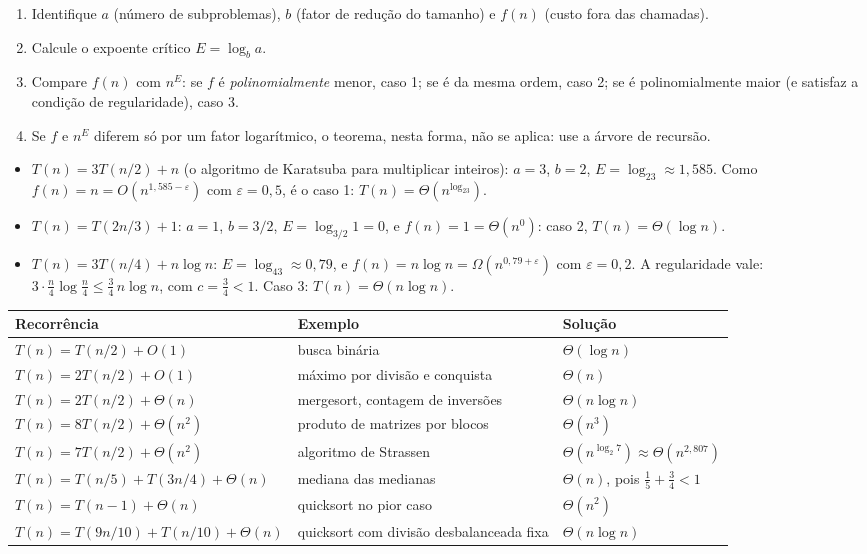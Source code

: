 \begin{roteiro}
\begin{enumerate}
  \item Identifique $a$ (número de subproblemas), $b$ (fator de redução do tamanho) e $f(n)$ (custo fora das chamadas).
  \item Calcule o expoente crítico $E=\log_ba$.
  \item Compare $f(n)$ com $n^E$: se $f$ é \emph{polinomialmente} menor, caso 1; se é da mesma ordem, caso 2; se é polinomialmente maior (e satisfaz a condição de regularidade), caso 3.
  \item Se $f$ e $n^E$ diferem só por um fator logarítmico, o teorema, nesta forma, não se aplica: use a árvore de recursão.
\end{enumerate}
\end{roteiro}

\begin{exemplo}\label{ex:mestre}\leavevmode
\begin{itemize}
  \item $T(n)=3T(n/2)+n$ (o algoritmo de Karatsuba para multiplicar inteiros): $a=3$, $b=2$, $E=\log_23\approx1{,}585$. Como $f(n)=n=O(n^{1{,}585-\varepsilon})$ com $\varepsilon=0{,}5$, é o caso 1: $T(n)=\Theta(n^{\log_23})$.
  \item $T(n)=T(2n/3)+1$: $a=1$, $b=3/2$, $E=\log_{3/2}1=0$, e $f(n)=1=\Theta(n^0)$: caso 2, $T(n)=\Theta(\log n)$.
  \item $T(n)=3T(n/4)+n\log n$: $E=\log_43\approx0{,}79$, e $f(n)=n\log n=\Omega(n^{0{,}79+\varepsilon})$ com $\varepsilon=0{,}2$. A regularidade vale: $3\cdot\frac n4\log\frac n4\le\frac34\,n\log n$, com $c=\frac34<1$. Caso 3: $T(n)=\Theta(n\log n)$.
\end{itemize}
\end{exemplo}

\begin{center}
\small
\begin{tabular}{@{}lll@{}}
\toprule
Recorrência & Exemplo & Solução\\
\midrule
$T(n)=T(n/2)+O(1)$ & busca binária & $\Theta(\log n)$\\
$T(n)=2T(n/2)+O(1)$ & máximo por divisão e conquista & $\Theta(n)$\\
$T(n)=2T(n/2)+\Theta(n)$ & mergesort, contagem de inversões & $\Theta(n\log n)$\\
$T(n)=8T(n/2)+\Theta(n^2)$ & produto de matrizes por blocos & $\Theta(n^3)$\\
$T(n)=7T(n/2)+\Theta(n^2)$ & algoritmo de Strassen & $\Theta(n^{\log_2 7})\approx\Theta(n^{2{,}807})$\\
$T(n)=T(n/5)+T(3n/4)+\Theta(n)$ & mediana das medianas & $\Theta(n)$, pois $\tfrac15+\tfrac34<1$\\
$T(n)=T(n-1)+\Theta(n)$ & quicksort no pior caso & $\Theta(n^2)$\\
$T(n)=T(9n/10)+T(n/10)+\Theta(n)$ & quicksort com divisão desbalanceada fixa & $\Theta(n\log n)$\\
\bottomrule
\end{tabular}
\end{center}

